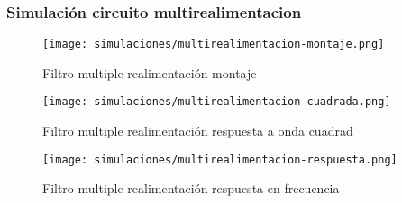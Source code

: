 \subsubsection{Simulación circuito multirealimentacion}

\begin{figure}[ht]
    \centering
    \texttt{[image: simulaciones/multirealimentacion-montaje.png]}
    \caption{Filtro multiple realimentación montaje}\label{fig:sim-multirealimentacion-montaje} 
\end{figure}
\begin{figure}[ht]
    \centering
    \texttt{[image: simulaciones/multirealimentacion-cuadrada.png]}
    \caption{Filtro multiple realimentación respuesta a onda cuadrad  }
    \label{fig:sim-multirealimentacion-cuadrada} 
\end{figure}
\begin{figure}[ht]
    \centering
    \texttt{[image: simulaciones/multirealimentacion-respuesta.png]}
    \caption{Filtro multiple realimentación respuesta en frecuencia  }
    \label{fig:sim-multirealimentacion-respuesta} 
\end{figure}